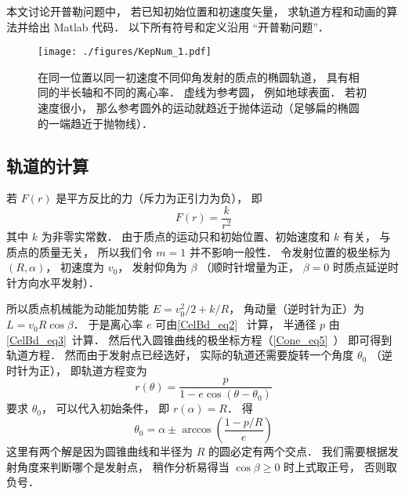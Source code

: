 
\begin{issues}
\end{issues}


本文讨论开普勒问题中， 若已知初始位置和初速度矢量， 求轨道方程和动画的算法并给出 Matlab 代码． 以下所有符号和定义沿用 “开普勒问题”．
\begin{figure}[ht]
\centering
\texttt{[image: ./figures/KepNum\_1.pdf]}
\caption{在同一位置以同一初速度不同仰角发射的质点的椭圆轨道， 具有相同的半长轴和不同的离心率． 虚线为参考圆， 例如地球表面． 若初速度很小， 那么参考圆外的运动就趋近于抛体运动（足够扁的椭圆的一端趋近于抛物线）．} \label{KepNum_fig1}
\end{figure}

\subsection{轨道的计算}
若 $F(r)$ 是平方反比的力（斥力为正引力为负）， 即
\begin{equation}
F(r) = \frac{k}{r^2}
\end{equation}
其中 $k$ 为非零实常数． 由于质点的运动只和初始位置、初始速度和 $k$ 有关， 与质点的质量无关， 所以我们令 $m=1$ 并不影响一般性． 令发射位置的极坐标为 $(R,\alpha)$， 初速度为 $v_0$， 发射仰角为 $\beta$ （顺时针增量为正， $\beta=0$ 时质点延逆时针方向水平发射）．

所以质点机械能为动能加势能 $E = v_0^2/2 + k/R$， 角动量（逆时针为正）为 $L = v_0 R\cos\beta$． 于是离心率 $e$ 可由\autoref{CelBd_eq2}~ 计算， 半通径 $p$ 由\autoref{CelBd_eq3}~计算． 然后代入圆锥曲线的极坐标方程（\autoref{Cone_eq5}~） 即可得到轨道方程． 然而由于发射点已经选好， 实际的轨道还需要旋转一个角度 $\theta_0$ （逆时针为正）， 即轨道方程变为
\begin{equation}\label{KepNum_eq1}
r(\theta)  = \frac{p}{1 - e\cos (\theta-\theta_0)}
\end{equation}
要求 $\theta_0$， 可以代入初始条件， 即 $r(\alpha) = R$． 得
\begin{equation}
\theta_0 = \alpha \pm \arccos(\frac{1-p/R}{e})
\end{equation}
这里有两个解是因为圆锥曲线和半径为 $R$ 的圆必定有两个交点． 我们需要根据发射角度来判断哪个是发射点， 稍作分析易得当 $\cos\beta \geqslant 0$ 时上式取正号， 否则取负号．

